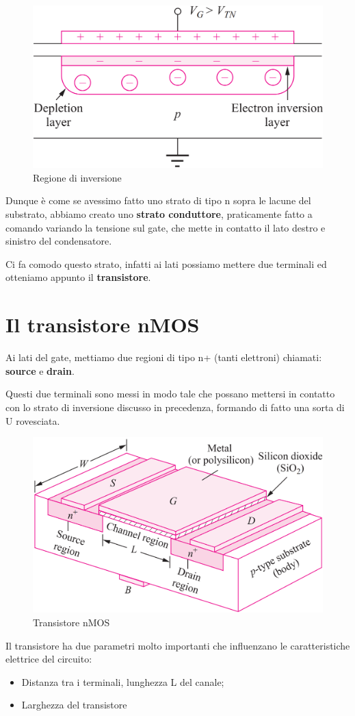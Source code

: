 \begin{figure}[htbp]
    \centering
    \includegraphics[width=0.4\linewidth]{img/inversione.png}
    \caption{Regione	di	inversione}
    
\end{figure}

Dunque è come se avessimo fatto uno strato di tipo n sopra le lacune del substrato, abbiamo creato uno \textbf{strato conduttore}, praticamente fatto a comando variando la tensione sul gate, che mette in contatto il lato destro e sinistro del condensatore.

Ci fa comodo questo strato, infatti ai lati possiamo mettere due terminali ed otteniamo appunto il \textbf{transistore}.

\newpage
\section{Il transistore nMOS}

Ai lati del gate, mettiamo due regioni di tipo n+ (tanti elettroni) chiamati: \textbf{source}  e \textbf{drain}.

Questi due terminali sono messi in modo tale che possano mettersi in contatto con lo strato di inversione discusso in precedenza, formando di fatto una sorta di U rovesciata.


\begin{figure}[htbp]
    \centering
    \includegraphics[width=0.5\linewidth]{img/nMOS.png}
    \caption{Transistore nMOS}    
\end{figure}

Il transistore ha due parametri molto importanti che influenzano le caratteristiche elettrice del circuito:
\begin{itemize}
    \item Distanza tra i terminali, lunghezza L del canale;
    \item Larghezza del transistore
\end{itemize}

